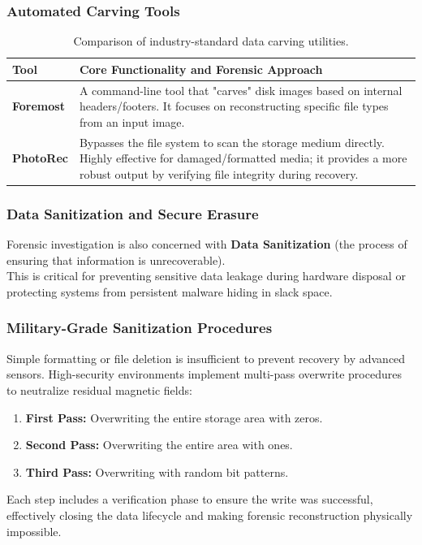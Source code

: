 \subsubsection*{Automated Carving Tools}
\begin{table}[H]
\centering
\small
\begin{tabular}{|p{2.5cm}|p{8cm}|}
\hline
\textbf{Tool} & \textbf{Core Functionality and Forensic Approach} \\
\hline
\textbf{Foremost} & A command-line tool that "carves" disk images based on internal headers/footers. It focuses on reconstructing specific file types from an input image. \\
\hline
\textbf{PhotoRec} & Bypasses the file system to scan the storage medium directly. Highly effective for damaged/formatted media; it provides a more robust output by verifying file integrity during recovery. \\
\hline
\end{tabular}
\caption{Comparison of industry-standard data carving utilities.}
\end{table}

\subsubsection{Data Sanitization and Secure Erasure}
Forensic investigation is also concerned with \textbf{Data Sanitization} (the process of ensuring that information is unrecoverable). \\
This is critical for preventing sensitive data leakage during hardware disposal or protecting systems from persistent malware hiding in slack space.

\subsubsection*{Military-Grade Sanitization Procedures}
Simple formatting or file deletion is insufficient to prevent recovery by advanced sensors. High-security environments implement multi-pass overwrite procedures to neutralize residual magnetic fields:
\begin{enumerate}
    \item \textbf{First Pass:} Overwriting the entire storage area with zeros.
    \item \textbf{Second Pass:} Overwriting the entire area with ones.
    \item \textbf{Third Pass:} Overwriting with random bit patterns.
\end{enumerate}
Each step includes a verification phase to ensure the write was successful, effectively closing the data lifecycle and making forensic reconstruction physically impossible.

